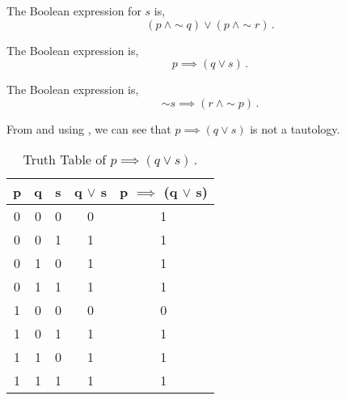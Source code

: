 \begin{subquestions}
\subquestion

The Boolean expression for $s$ is,
\begin{equation}
	(p ~\land \sim q) \lor (p ~\land \sim r)\,.
\end{equation}


\subquestion

\begin{subsubquestions}
	
\subsubquestion

The Boolean expression is,
\begin{equation}
	p \implies (q \lor s)\,.
\end{equation}


\subsubquestion

The Boolean expression is,
\begin{equation}
	\sim s \implies (r ~\land \sim p)\,.
\end{equation}


\subsubquestion

From  and using , we can see that $p \implies (q \lor s)$ is not a tautology.
\begin{table}[ht]
	\centering
	\begin{tabular}{|c|c|c|c|c|}
		\hline
		p & q & s & q $\lor$ s & p $\implies$ (q $\lor$ s) \\
		\hline
		0 & 0 & 0 & 0 & 1 \\
		0 & 0 & 1 & 1 & 1 \\
		0 & 1 & 0 & 1 & 1 \\
		0 & 1 & 1 & 1 & 1 \\
		1 & 0 & 0 & 0 & 0 \\
		1 & 0 & 1 & 1 & 1 \\
		1 & 1 & 0 & 1 & 1 \\
		1 & 1 & 1 & 1 & 1 \\
		\hline
	\end{tabular}
	\caption{\label{2016:q1:tab:TruthTab2} Truth Table of $p \implies (q \lor s)$\,.}
\end{table}

\end{subsubquestions}

\end{subquestions}

